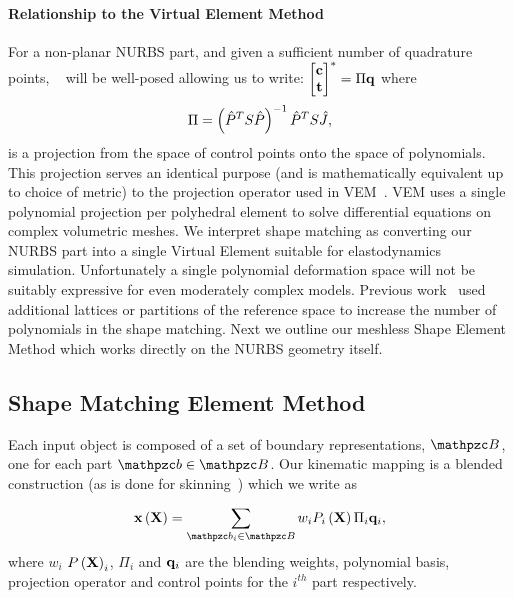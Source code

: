 \paragraph*{Relationship to the Virtual Element Method}
For a non-planar NURBS part, and given a sufficient number of quadrature points, ~ will be well-posed allowing us to write: $\begin{bmatrix} \mathbf{c}\\ \mathbf{t} \end{bmatrix}^* = \Pi\mathbf{q}$ where
\begin{equation*}
    \Pi = \left(\hat{P}^TS\hat{P}\right)^{-1}\hat{P}^TS\hat{J},
\end{equation*} is a projection from the space of control points onto the space of polynomials. 
This projection serves an identical purpose (and is mathematically equivalent up to choice of metric) to the projection operator used in VEM~\cite{10.1142/S021820251440003X}.
VEM uses a single polynomial projection per polyhedral element to solve differential equations on complex volumetric meshes.
We interpret shape matching as converting our NURBS part into a single Virtual Element suitable for elastodynamics simulation.
Unfortunately a single polynomial deformation space will not be suitably expressive for even moderately complex models. 
Previous work~\cite{10.1145/1073204.1073216,10.1145/1275808.1276480} used additional lattices or partitions of the reference space to 
increase the number of polynomials in the shape matching. Next we outline our meshless Shape Element Method which works directly on the NURBS
geometry itself.

\subsection{Shape Matching Element Method}
 Each input object is composed of a set of boundary representations, $\Prts$, one for each part $\prt\in\Prts$. 
 Our kinematic mapping is a blended construction (as is done for skinning~\cite{10.1145/2614028.2615427}) which we write as

 \begin{equation}
    \defX\left(\refX\right) = \sum_{\prt_i\in\Prts} \bld_i\Pmatxi\Pi_i\vc{q}_i, 
    \label{eq:kinematics}
 \end{equation} where $w_i$ $P\left(\mathbf{X}\right)_i$, $\Pi_i$ and $\mathbf{q}_i$ are the blending weights, polynomial basis, projection operator and control points for the $i^{th}$
 part respectively.  
 
